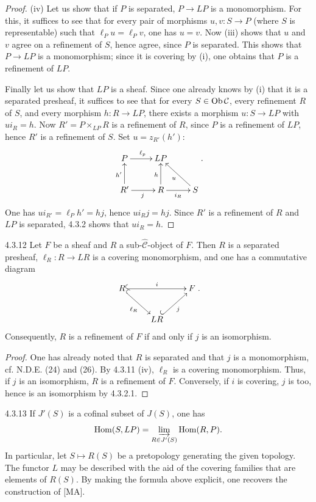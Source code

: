 \begin{proof}
(iv) Let us show that if \(P\) is separated, \(P\to LP\) is a
monomorphism. For this, it suffices to see that for every pair of
morphisms \(u,v:S\to P\) (where \(S\) is representable) such that
\(\ell_Pu=\ell_Pv\), one has \(u=v\).
Now \loccit{} (iii) shows that \(u\) and \(v\) agree on a refinement
of \(S\), hence agree, since \(P\) is separated.
This shows that \(P\to LP\) is a monomorphism; since it is covering
by (i), one obtains that \(P\) is a refinement of \(LP\).

Finally let us show that \(LP\) is a sheaf.
Since one already knows by (i) that it is a separated presheaf,
it suffices to see that for every \(S\in\operatorname{Ob}\mathcal C\), every
refinement \(R\) of \(S\), and every morphism \(h:R\to LP\), there
exists a morphism \(u:S\to LP\) with \(ui_R=h\).
Now \(R'=P\times_{LP}R\) is a refinement of \(R\), since \(P\) is
a refinement of \(LP\), hence \(R'\) is a refinement of \(S\).
Set \(u=z_{R'}(h')\):
\[
\xymatrix{
P\ar[r]^{\ell_p} & LP\\
R'\ar[u]^{h'}\ar[r]_j & R\ar[u]^h\ar[r]_{i_R} & S\ar[ul]^u }.
\]
One has \(ui_{R'}=\ell_Ph'=hj\), hence \(ui_Rj=hj\).
Since \(R'\) is a refinement of \(R\) and \(LP\) is separated,
4.3.2 shows that \(ui_R=h\).
\end{proof}

\begin{corollary}{4.3.12}\label{IV.4.3.12}
Let \(F\) be a sheaf and \(R\) a sub-\(\widehat{\mathcal C}\)-object
of \(F\). Then \(R\) is a separated presheaf,
\(\ell_R:R\to LR\) is a covering monomorphism, and one has a
commutative diagram
\[
\xymatrix{
R\ar@{^{(}->}[rr]^i\ar@{^{(}->}[dr]_{\ell_R} & & F\\
 & LR\ar@{^{(}->}[ur]_j & }.
\]
Consequently, \(R\) is a refinement of \(F\) if and only if \(j\)
is an isomorphism.
\end{corollary}
\begin{proof}
One has already noted that \(R\) is separated and that \(j\) is a
monomorphism, cf. N.D.E. (24) and (26).
By 4.3.11 (iv), \(\ell_R\) is a covering monomorphism.
Thus, if \(j\) is an isomorphism, \(R\) is a refinement of \(F\).
Conversely, if \(i\) is covering, \(j\) is too, hence is an
isomorphism by 4.3.2.1.
\end{proof}

\begin{remark}{4.3.13}\label{IV.4.3.13}
If \(J'(S)\) is a cofinal subset of \(J(S)\), one has
\[
\operatorname{Hom}(S,LP)=\varinjlim_{R\in J'(S)}\operatorname{Hom}(R,P).
\]
In particular, let \(S\mapsto R(S)\) be a pretopology generating
the given topology. The functor \(L\) may be described with the aid
of the covering families that are elements of \(R(S)\).
By making the formula above explicit, one recovers the construction of [MA].
\end{remark}

